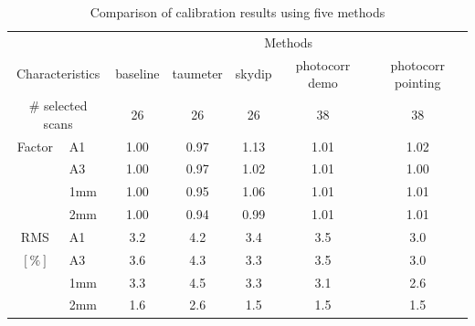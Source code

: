 \begin{table}[th]
\begin{center}
\begin{tabular}{|c|l|c|c|c|c|c|}
  \hline
  \multicolumn{2}{|c|}{}  &  \multicolumn{5}{|c|}{Methods} \\\cline{3-7}
  \multicolumn{2}{|c|}{Characteristics} &  baseline  & taumeter  &  skydip  &  photocorr demo & photocorr pointing \\
  \hline\hline
   \multicolumn{2}{|c|}{$\#$ selected scans} & 26    &       26  &    26    &    38           &    38 \\ 
  \hline 
  Factor &  A1          &   1.00  &  0.97   &  1.13    &   1.01    &   1.02  \\
       &  A3            &   1.00  &  0.97   &  1.02    &   1.01    &   1.00  \\
       &  1mm           &   1.00  &  0.95   &  1.06    &   1.01    &   1.01  \\
       &  2mm           &   1.00  &  0.94   &  0.99    &   1.01    &   1.01  \\
  \hline
  RMS  &  A1            &  3.2    &   4.2   &   3.4    &    3.5    &   3.0 \\
  $[\%]$     &  A3            &  3.6    &   4.3   &   3.3    &    3.5    &   3.0 \\
       &  1mm           &  3.3    &   4.5   &   3.3    &    3.1    &   2.6 \\
       &  2mm           &  1.6    &   2.6   &   1.5    &    1.5    &   1.5 \\
\hline\hline
\end{tabular}
\caption[Comparison of calibration results using five methods]{Comparison of calibration results using five methods}
\label{tab:Abs_calibration_results_all}
\end{center}
\end{table}





